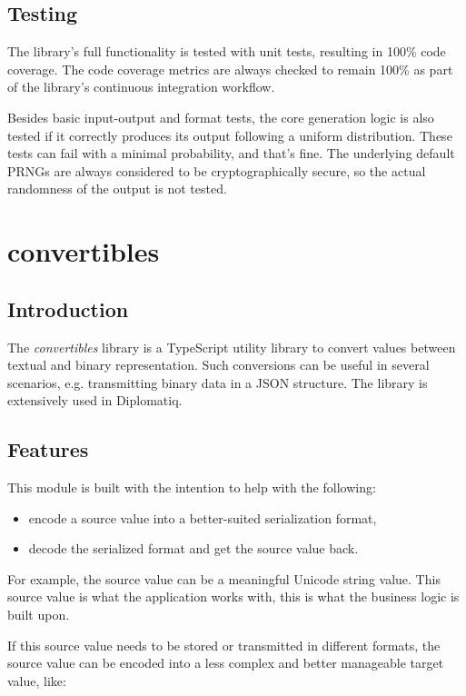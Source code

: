 \subsection{Testing}

The library's full functionality is tested with unit tests, resulting in 100\% code coverage. The code coverage metrics are always checked to remain 100\% as part of the library's continuous integration workflow.

Besides basic input-output and format tests, the core generation logic is also tested if it correctly produces its output following a uniform distribution. These tests can fail with a minimal probability, and that's fine. The underlying default PRNGs are always considered to be cryptographically secure, so the actual randomness of the output is not tested.

\section{convertibles}

\subsection{Introduction}

The \emph{convertibles} library is a TypeScript utility library to convert values between textual and binary representation. Such conversions can be useful in several scenarios, e.g. transmitting binary data in a JSON structure. The library is extensively used in Diplomatiq.

\subsection{Features}

This module is built with the intention to help with the following:

\begin{itemize}
\item encode a source value into a better-suited serialization format,
\item decode the serialized format and get the source value back.
\end{itemize}

For example, the source value can be a meaningful Unicode string value. This source value is what the application works with, this is what the business logic is built upon.

If this source value needs to be stored or transmitted in different formats, the source value can be encoded into a less complex and better manageable target value, like:


